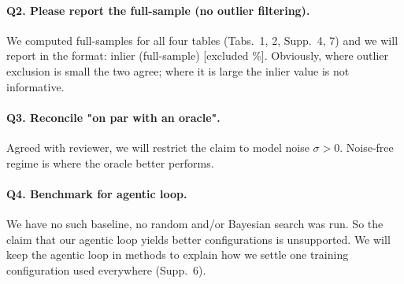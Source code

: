 \documentclass[11pt]{article}
\begin{document}
\label{link4}
\paragraph{Q2. Please report the full-sample (no outlier filtering).}
We computed full-samples for all four tables (Tabs.~1, 2, Supp.~4, 7) and  we will report in the format: inlier (full-sample) [excluded \%].
Obviously, where outlier exclusion is small the two agree; where it is large the inlier value is not informative. 

\paragraph{Q3. Reconcile "on par with an oracle". }
Agreed with reviewer, we will restrict the claim to model noise $\sigma > 0$. Noise-free regime is where the oracle better performs.

\paragraph{Q4. Benchmark for agentic loop.}
We have no such baseline, no random and/or Bayesian search was run. 
So the claim that our agentic loop yields better configurations is
unsupported. We will keep the agentic loop in methods to explain how we settle one training configuration used everywhere (Supp.~6).

\label{link8}
\end{document}
